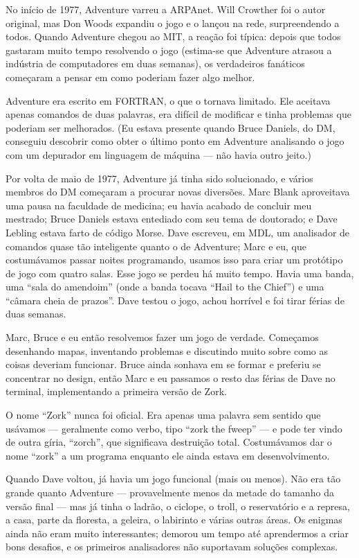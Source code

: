 \documentclass[12pt,a4paper]{article}
\begin{document}
No início de 1977, Adventure varreu a ARPAnet. Will Crowther foi o autor original, mas Don Woods expandiu o jogo e o lançou na rede, surpreendendo a todos. Quando Adventure chegou ao MIT, a reação foi típica: depois que todos gastaram muito tempo resolvendo o jogo (estima-se que Adventure atrasou a indústria de computadores em duas semanas), os verdadeiros fanáticos começaram a pensar em como poderiam fazer algo melhor.

Adventure era escrito em FORTRAN, o que o tornava limitado. Ele aceitava apenas comandos de duas palavras, era difícil de modificar e tinha problemas que poderiam ser melhorados. (Eu estava presente quando Bruce Daniels, do DM, conseguiu descobrir como obter o último ponto em Adventure analisando o jogo com um depurador em linguagem de máquina — não havia outro jeito.)

Por volta de maio de 1977, Adventure já tinha sido solucionado, e vários membros do DM começaram a procurar novas diversões. Marc Blank aproveitava uma pausa na faculdade de medicina; eu havia acabado de concluir meu mestrado; Bruce Daniels estava entediado com seu tema de doutorado; e Dave Lebling estava farto de código Morse. Dave escreveu, em MDL, um analisador de comandos quase tão inteligente quanto o de Adventure; Marc e eu, que costumávamos passar noites programando, usamos isso para criar um protótipo de jogo com quatro salas. Esse jogo se perdeu há muito tempo. Havia uma banda, uma “sala do amendoim” (onde a banda tocava “Hail to the Chief”) e uma “câmara cheia de prazos”. Dave testou o jogo, achou horrível e foi tirar férias de duas semanas.

Marc, Bruce e eu então resolvemos fazer um jogo de verdade. Começamos desenhando mapas, inventando problemas e discutindo muito sobre como as coisas deveriam funcionar. Bruce ainda sonhava em se formar e preferiu se concentrar no design, então Marc e eu passamos o resto das férias de Dave no terminal, implementando a primeira versão de Zork.

O nome “Zork” nunca foi oficial. Era apenas uma palavra sem sentido que usávamos — geralmente como verbo, tipo “zork the fweep” — e pode ter vindo de outra gíria, “zorch”, que significava destruição total. Costumávamos dar o nome “zork” a um programa enquanto ele ainda estava em desenvolvimento.

Quando Dave voltou, já havia um jogo funcional (mais ou menos). Não era tão grande quanto Adventure — provavelmente menos da metade do tamanho da versão final — mas já tinha o ladrão, o ciclope, o troll, o reservatório e a represa, a casa, parte da floresta, a geleira, o labirinto e várias outras áreas. Os enigmas ainda não eram muito interessantes; demorou um tempo até aprendermos a criar bons desafios, e os primeiros analisadores não suportavam soluções complexas.
\end{document}
